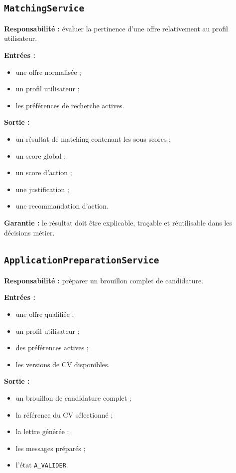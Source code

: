\documentclass[11pt,a4paper]{article}
\begin{document}
\subsection{\texttt{MatchingService}}

\textbf{Responsabilité :} évaluer la pertinence d’une offre relativement au profil utilisateur.

\textbf{Entrées :}
\begin{itemize}
    \item une offre normalisée ;
    \item un profil utilisateur ;
    \item les préférences de recherche actives.
\end{itemize}

\textbf{Sortie :}
\begin{itemize}
    \item un résultat de matching contenant les sous-scores ;
    \item un score global ;
    \item un score d’action ;
    \item une justification ;
    \item une recommandation d’action.
\end{itemize}

\textbf{Garantie :}
le résultat doit être explicable, traçable et réutilisable dans les décisions métier.

\subsection{\texttt{ApplicationPreparationService}}

\textbf{Responsabilité :} préparer un brouillon complet de candidature.

\textbf{Entrées :}
\begin{itemize}
    \item une offre qualifiée ;
    \item un profil utilisateur ;
    \item des préférences actives ;
    \item les versions de CV disponibles.
\end{itemize}

\textbf{Sortie :}
\begin{itemize}
    \item un brouillon de candidature complet ;
    \item la référence du CV sélectionné ;
    \item la lettre générée ;
    \item les messages préparés ;
    \item l’état \texttt{A\_VALIDER}.
\end{itemize}
\end{document}
